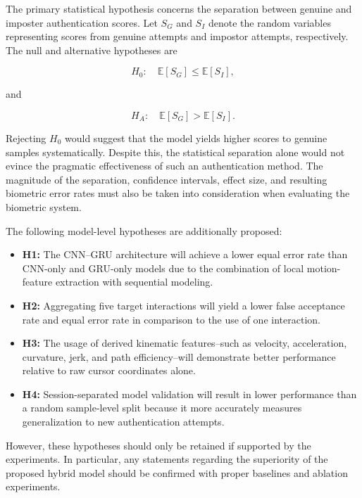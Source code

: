 \documentclass[conference]{IEEEtran}
\begin{document}
The primary statistical hypothesis concerns the separation between genuine and imposter authentication scores. Let $S_G$ and $S_I$ denote the random variables representing scores from genuine attempts and impostor attempts, respectively. The null and alternative hypotheses are 

\begin{equation}
H_0:\quad
\mathbb{E}[S_G]
\leq
\mathbb{E}[S_I],
\label{eq:null_hypothesis}
\end{equation}

and

\begin{equation}
H_A:\quad
\mathbb{E}[S_G]
>
\mathbb{E}[S_I].
\label{eq:alternative_hypothesis}
\end{equation}

Rejecting $H_0$ would suggest that the model yields higher scores to genuine samples systematically. Despite this, the statistical separation alone would not evince the pragmatic effectiveness of such an authentication method. The magnitude of the separation, confidence intervals, effect size, and resulting biometric error rates must also be taken into consideration when evaluating the biometric system. 

The following model-level hypotheses are additionally proposed:

\begin{itemize}
\item \textbf{H1:} The CNN--GRU architecture will achieve a lower equal error rate than CNN-only and GRU-only models due to the combination of local motion-feature extraction with sequential modeling. 

\item \textbf{H2:} Aggregating five target interactions will yield a lower false acceptance rate and equal error rate in comparison to the use of one interaction. 

\item \textbf{H3:} The usage of derived kinematic features--such as velocity, acceleration, curvature, jerk, and path efficiency--will demonstrate better performance relative to raw cursor coordinates alone. 

\item \textbf{H4:} Session-separated model validation will result in lower performance than a random sample-level split because it more accurately measures generalization to new authentication attempts.
\end{itemize}

However, these hypotheses should only be retained if supported by the experiments. In particular, any statements regarding the superiority of the proposed hybrid model should be confirmed with proper baselines and ablation experiments. 
\end{document}
